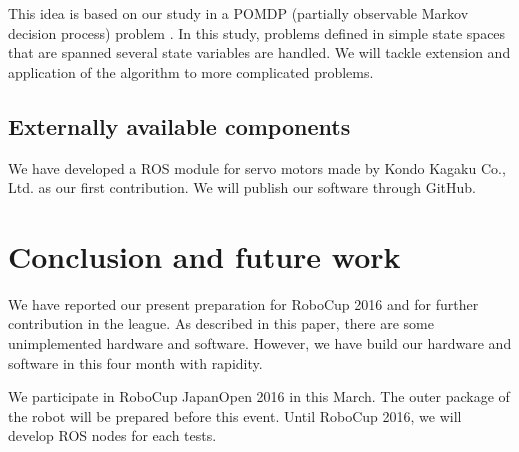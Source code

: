 \documentclass{llncs}
\begin{document}
This idea is based on our study in a POMDP
(partially observable Markov decision process) problem
\cite{ueda2015}. In this study, problems defined in
simple state spaces that are spanned several state variables
are handled. We will tackle extension and application of
the algorithm to more complicated problems.


\subsection{Externally available components}

We have developed a ROS module for servo motors made
by Kondo Kagaku Co., Ltd.
as our first contribution\cite{hayashibara_kondo}.
We will publish our software through GitHub.

\section{Conclusion and future work}\label{sec:conclusion}

We have reported our present preparation for
RoboCup 2016 and for further contribution in the league.
As described in this paper, there are some unimplemented
hardware and software. However, we have build our hardware
and software in this four month with rapidity.

We participate in RoboCup JapanOpen 2016 in this March.
The outer package of the robot will be prepared before
this event. Until RoboCup 2016, we will develop
ROS nodes for each tests.





\end{document}
